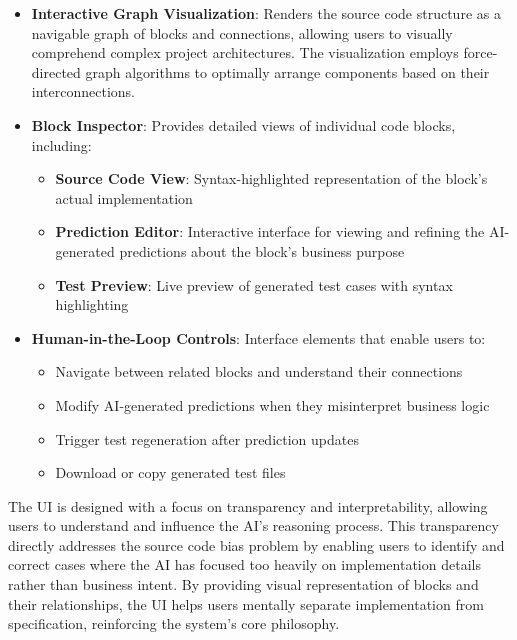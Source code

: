 \begin{itemize}
    \item \textbf{Interactive Graph Visualization}: Renders the source code structure as a navigable graph of blocks and connections, allowing users to visually comprehend complex project architectures. The visualization employs force-directed graph algorithms to optimally arrange components based on their interconnections.
    
    \item \textbf{Block Inspector}: Provides detailed views of individual code blocks, including:
    \begin{itemize}
        \item \textbf{Source Code View}: Syntax-highlighted representation of the block's actual implementation
        \item \textbf{Prediction Editor}: Interactive interface for viewing and refining the AI-generated predictions about the block's business purpose
        \item \textbf{Test Preview}: Live preview of generated test cases with syntax highlighting
    \end{itemize}
    
    \item \textbf{Human-in-the-Loop Controls}: Interface elements that enable users to:
    \begin{itemize}
        \item Navigate between related blocks and understand their connections
        \item Modify AI-generated predictions when they misinterpret business logic
        \item Trigger test regeneration after prediction updates
        \item Download or copy generated test files
    \end{itemize}
\end{itemize}

\hspace{0.5cm}The UI is designed with a focus on transparency and interpretability, allowing users to understand and influence the AI's reasoning process. This transparency directly addresses the source code bias problem by enabling users to identify and correct cases where the AI has focused too heavily on implementation details rather than business intent. By providing visual representation of blocks and their relationships, the UI helps users mentally separate implementation from specification, reinforcing the system's core philosophy.

